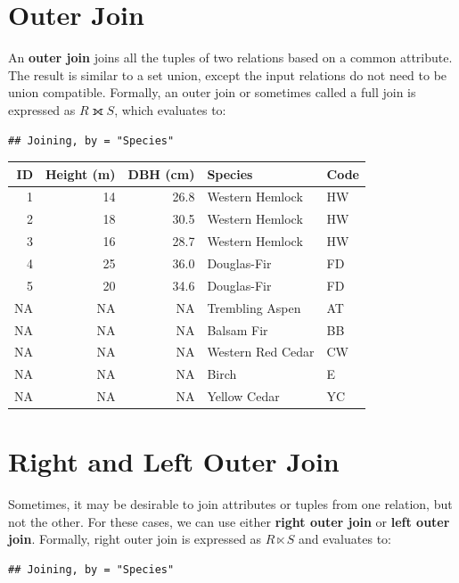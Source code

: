 \documentclass[
]{book}
\begin{document}
\hypertarget{outer-join}{%
\section{Outer Join}\label{outer-join}}

An \textbf{outer join} joins all the tuples of two relations based on a common attribute. The result is similar to a set union, except the input relations do not need to be union compatible. Formally, an outer join or sometimes called a full join is expressed as \(R⟗S\), which evaluates to:

\begin{verbatim}
## Joining, by = "Species"
\end{verbatim}

\begin{tabular}{rrrll}
\toprule
ID & Height (m) & DBH (cm) & Species & Code\\
\midrule
1 & 14 & 26.8 & Western Hemlock & HW\\
2 & 18 & 30.5 & Western Hemlock & HW\\
3 & 16 & 28.7 & Western Hemlock & HW\\
4 & 25 & 36.0 & Douglas-Fir & FD\\
5 & 20 & 34.6 & Douglas-Fir & FD\\
\addlinespace
NA & NA & NA & Trembling Aspen & AT\\
NA & NA & NA & Balsam Fir & BB\\
NA & NA & NA & Western Red Cedar & CW\\
NA & NA & NA & Birch & E\\
NA & NA & NA & Yellow Cedar & YC\\
\bottomrule
\end{tabular}

\hypertarget{right-and-left-outer-join}{%
\section{Right and Left Outer Join}\label{right-and-left-outer-join}}

Sometimes, it may be desirable to join attributes or tuples from one relation, but not the other. For these cases, we can use either \textbf{right outer join} or \textbf{left outer join}. Formally, right outer join is expressed as \(R⋉S\) and evaluates to:

\begin{verbatim}
## Joining, by = "Species"
\end{verbatim}
\end{document}
